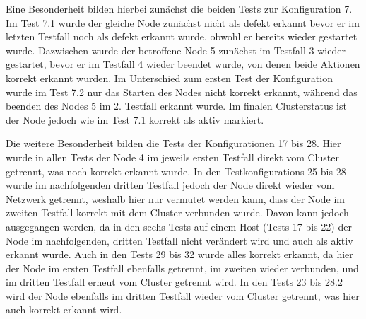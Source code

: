 Eine Besonderheit bilden hierbei zunächst die beiden \glspl{Test} zur Konfiguration 7.
Im \gls{Test} 7.1 wurde der gleiche Node zunächst nicht als defekt erkannt bevor er im letzten \gls{Testfall} noch als defekt erkannt wurde, obwohl er bereits wieder gestartet wurde.
Dazwischen wurde der betroffene Node 5 zunächst im \gls{Testfall} 3 wieder gestartet, bevor er im \gls{Testfall} 4 wieder beendet wurde, von denen beide Aktionen korrekt erkannt wurden.
Im Unterschied zum ersten \gls{Test} der Konfiguration wurde im \gls{Test} 7.2 nur das Starten des Nodes nicht korrekt erkannt, während das beenden des Nodes 5 im 2. \gls{Testfall} erkannt wurde.
Im finalen Clusterstatus ist der Node jedoch wie im \gls{Test} 7.1 korrekt als aktiv markiert.

Die weitere Besonderheit bilden die \glspl{Test} der Konfigurationen 17 bis 28.
Hier wurde in allen \glspl{Test} der Node 4 im jeweils ersten \gls{Testfall} direkt vom Cluster getrennt, was noch korrekt erkannt wurde.
In den \glspl{Testkonfiguration} 25 bis 28 wurde im nachfolgenden dritten \gls{Testfall} jedoch der Node direkt wieder vom Netzwerk getrennt, weshalb hier nur vermutet werden kann, dass der Node im zweiten \gls{Testfall} korrekt mit dem Cluster verbunden wurde.
Davon kann jedoch ausgegangen werden, da in den sechs \glspl{Test} auf einem Host (Tests 17 bis 22) der Node im nachfolgenden, dritten \gls{Testfall} nicht verändert wird und auch als aktiv erkannt wurde.
Auch in den \glspl{Test} 29 bis 32 wurde alles korrekt erkannt, da hier der Node im ersten \gls{Testfall} ebenfalls getrennt, im zweiten wieder verbunden, und im dritten \gls{Testfall} erneut vom Cluster getrennt wird.
In den \glspl{Test} 23 bis 28.2 wird der Node ebenfalls im dritten \gls{Testfall} wieder vom Cluster getrennt, was hier auch korrekt erkannt wird.
